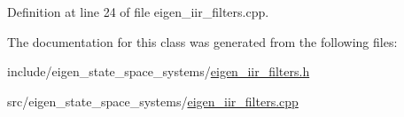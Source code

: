 Definition at line 24 of file eigen\+\_\+iir\+\_\+filters.\+cpp.



The documentation for this class was generated from the following files\+:\begin{DoxyCompactItemize}
\item 
include/eigen\+\_\+state\+\_\+space\+\_\+systems/\hyperlink{eigen__iir__filters_8h}{eigen\+\_\+iir\+\_\+filters.\+h}\item 
src/eigen\+\_\+state\+\_\+space\+\_\+systems/\hyperlink{eigen__iir__filters_8cpp}{eigen\+\_\+iir\+\_\+filters.\+cpp}\end{DoxyCompactItemize}
